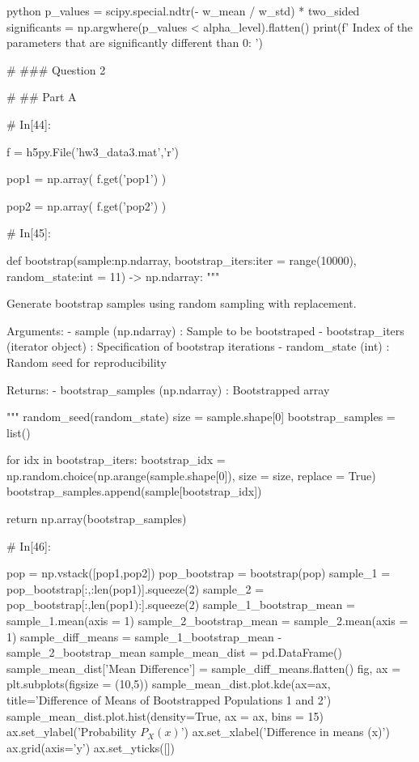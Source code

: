 \documentclass[12pt]{amsart}
\begin{document}
\begin{mintedbox}{python}
p_values = scipy.special.ndtr(- w_mean / w_std) * two_sided
significants = np.argwhere(p_values < alpha_level).flatten()
print(f' Index of the parameters that are significantly different than 0: ')
     


# ### Question 2

# ## Part A

# In[44]:


f = h5py.File('hw3_data3.mat','r')
  
pop1 = np.array(
    f.get('pop1')
    )

pop2 = np.array(
    f.get('pop2')
    )


# In[45]:


def bootstrap(sample:np.ndarray, bootstrap_iters:iter = range(10000), random_state:int = 11) -> np.ndarray:
    """
    
        Generate bootstrap samples using random sampling with replacement.
        
            Arguments:
                - sample (np.ndarray) : Sample to be bootstraped
                - bootstrap_iters (iterator object) : Specification of bootstrap iterations
                - random_state (int) : Random seed for reproducibility

            Returns:
                - bootstrap_samples (np.ndarray) : Bootstrapped array

    """
    random_seed(random_state)
    size = sample.shape[0]
    bootstrap_samples = list()

    for idx in bootstrap_iters:        
        bootstrap_idx = np.random.choice(np.arange(sample.shape[0]), size = size, replace = True)
        bootstrap_samples.append(sample[bootstrap_idx])
    
    return np.array(bootstrap_samples)


# In[46]:


pop = np.vstack([pop1,pop2])
pop_bootstrap = bootstrap(pop)
sample_1 = pop_bootstrap[:,:len(pop1)].squeeze(2)
sample_2 = pop_bootstrap[:,len(pop1):].squeeze(2)
sample_1_bootstrap_mean = sample_1.mean(axis = 1)
sample_2_bootstrap_mean = sample_2.mean(axis = 1)
sample_diff_means = sample_1_bootstrap_mean - sample_2_bootstrap_mean
sample_mean_dist = pd.DataFrame()
sample_mean_dist['Mean Difference'] = sample_diff_means.flatten()
fig, ax = plt.subplots(figsize = (10,5))
sample_mean_dist.plot.kde(ax=ax, title='Difference of Means of Bootstrapped Populations 1 and 2')
sample_mean_dist.plot.hist(density=True, ax = ax, bins = 15)
ax.set_ylabel('Probability $P_X(x)$')
ax.set_xlabel('Difference in means (x)')
ax.grid(axis='y')
ax.set_yticks([])



\end{mintedbox}
\end{document}
